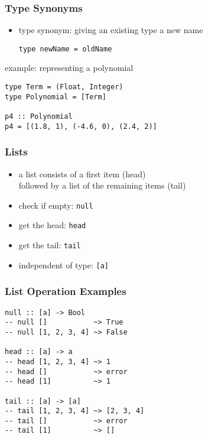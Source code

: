 \documentclass[dvipsnames]{beamer}
\theoremstyle{plain}
\begin{document}
\begin{frame}[fragile]
  \frametitle{Type Synonyms}

  \begin{itemize}
    \item type synonym: giving an existing type a new name
    \smallskip
    \begin{lstlisting}
type newName = oldName
    \end{lstlisting}
  \end{itemize}

  \pause
  \begin{exampleblock}{example: representing a polynomial}
    \begin{lstlisting}
type Term = (Float, Integer)
type Polynomial = [Term]

p4 :: Polynomial
p4 = [(1.8, 1), (-4.6, 0), (2.4, 2)]
    \end{lstlisting}
  \end{exampleblock}
\end{frame}

\begin{frame}
  \frametitle{Lists}

  \begin{itemize}
    \item a list consists of a first item (\alert{head})\\
      followed by a list of the remaining items (\alert{tail})

    \medskip
    \item check if empty: \lstinline|null|
    \item get the head: \lstinline|head|
    \item get the tail: \lstinline|tail|

    \pause
    \medskip
    \item independent of type: \lstinline|[a]|
  \end{itemize}
\end{frame}

\begin{frame}[fragile]
  \frametitle{List Operation Examples}

  \begin{lstlisting}
null :: [a] -> Bool
-- null []           ~> True
-- null [1, 2, 3, 4] ~> False

head :: [a] -> a
-- head [1, 2, 3, 4] ~> 1
-- head []           ~> error
-- head [1]          ~> 1

tail :: [a] -> [a]
-- tail [1, 2, 3, 4] ~> [2, 3, 4]
-- tail []           ~> error
-- tail [1]          ~> []
  \end{lstlisting}
\end{frame}
\end{document}
